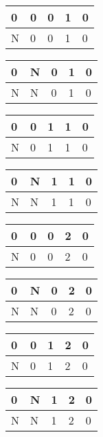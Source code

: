 \qquad\begin{tabular}{ | l | l | l | l | l |}
\hline
0 & 0 & 0 & 1 & 0 \\
\hline
N & 0 & 0 & 1 & 0 \\
\hline
\end{tabular}
\qquad\begin{tabular}{ | l | l | l | l | l |}
\hline
0 & N & 0 & 1 & 0 \\
\hline
N & N & 0 & 1 & 0 \\
\hline
\end{tabular}
\qquad\begin{tabular}{ | l | l | l | l | l |}
\hline
0 & 0 & 1 & 1 & 0 \\
\hline
N & 0 & 1 & 1 & 0 \\
\hline
\end{tabular}
\qquad\begin{tabular}{ | l | l | l | l | l |}
\hline
0 & N & 1 & 1 & 0 \\
\hline
N & N & 1 & 1 & 0 \\
\hline
\end{tabular}\par

\qquad\begin{tabular}{ | l | l | l | l | l |}
\hline
0 & 0 & 0 & 2 & 0 \\
\hline
N & 0 & 0 & 2 & 0 \\
\hline
\end{tabular}
\qquad\begin{tabular}{ | l | l | l | l | l |}
\hline
0 & N & 0 & 2 & 0 \\
\hline
N & N & 0 & 2 & 0 \\
\hline
\end{tabular}
\qquad\begin{tabular}{ | l | l | l | l | l |}
\hline
0 & 0 & 1 & 2 & 0 \\
\hline
N & 0 & 1 & 2 & 0 \\
\hline
\end{tabular}
\qquad\begin{tabular}{ | l | l | l | l | l |}
\hline
0 & N & 1 & 2 & 0 \\
\hline
N & N & 1 & 2 & 0 \\
\hline
\end{tabular}\par

